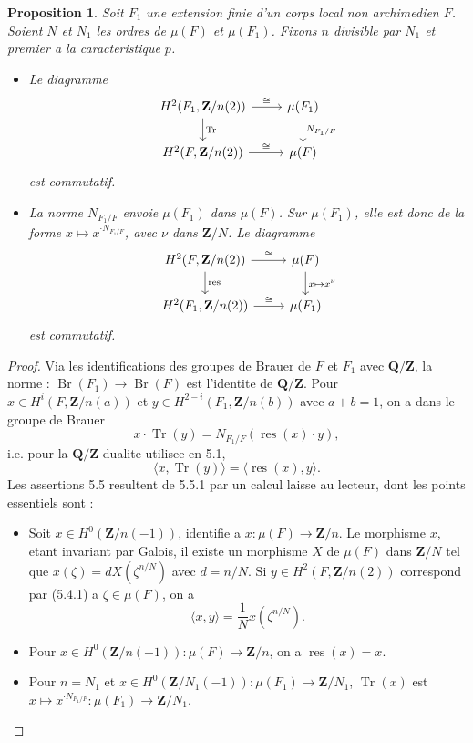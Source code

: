 \documentclass[11pt,a4paper]{article}
\theoremstyle{plain}
\newtheorem{proposition}[theorem]{Proposition}
\theoremstyle{definition}
\DeclareMathOperator{\Br}{Br}
\DeclareMathOperator{\res}{res}
\DeclareMathOperator{\Tr}{Tr}
\begin{document}
\begin{proposition}\label{5.5}
Soit $F_1$ une extension finie d'un corps local non archimedien $F$. Soient $N$ et $N_1$ les ordres de $\mu(F)$ et $\mu(F_1)$. Fixons $n$ divisible par $N_1$ et premier a la caracteristique $p$.
\begin{itemize}
\item[(i)] Le diagramme
\[
\begin{tikzcd}
H^2(F_1, \mathbf{Z}/n(2)) \arrow{r}{\cong} \arrow{d}{\Tr} & \mu(F_1) \arrow{d}{N_{F_1/F}} \\
H^2(F, \mathbf{Z}/n(2)) \arrow{r}{\cong} & \mu(F)
\end{tikzcd}
\]
est commutatif.
\item[(ii)] La norme $N_{F_1/F}$ envoie $\mu(F_1)$ dans $\mu(F)$. Sur $\mu(F_1)$, elle est donc de la forme $x \mapsto x^{\cdot N_{F_1/F}}$, avec $\nu$ dans $\mathbf{Z}/N$. Le diagramme
\[
\begin{tikzcd}
H^2(F, \mathbf{Z}/n(2)) \arrow{r}{\cong} \arrow{d}{\res} & \mu(F) \arrow{d}{x \mapsto x^{\nu}} \\
H^2(F_1, \mathbf{Z}/n(2)) \arrow{r}{\cong} & \mu(F_1)
\end{tikzcd}
\]
est commutatif.
\end{itemize}
\end{proposition}

\begin{proof}
Via les identifications des groupes de Brauer de $F$ et $F_1$ avec $\mathbf{Q}/\mathbf{Z}$, la norme : $\Br(F_1) \to \Br(F)$ est l'identite de $\mathbf{Q}/\mathbf{Z}$. Pour $x \in H^i(F, \mathbf{Z}/n(a))$ et $y \in H^{2-i}(F_1, \mathbf{Z}/n(b))$ avec $a + b = 1$, on a dans le groupe de Brauer
\[
x \cdot \Tr(y) = N_{F_1/F}(\res(x) \cdot y),
\]
i.e. pour la $\mathbf{Q}/\mathbf{Z}$-dualite utilisee en 5.1,
\begin{equation}\label{5.5.1}
\langle x, \Tr(y) \rangle = \langle \res(x), y \rangle.
\end{equation}
Les assertions 5.5 resultent de 5.5.1 par un calcul laisse au lecteur, dont les points essentiels sont :
\begin{itemize}
\item[a)] Soit $x \in H^0(\mathbf{Z}/n(-1))$, identifie a $x : \mu(F) \to \mathbf{Z}/n$. Le morphisme $x$, etant invariant par Galois, il existe un morphisme $X$ de $\mu(F)$ dans $\mathbf{Z}/N$ tel que $x(\zeta) = d X(\zeta^{n/N})$ avec $d = n/N$. Si $y \in H^2(F, \mathbf{Z}/n(2))$ correspond par (5.4.1) a $\zeta \in \mu(F)$, on a
\[
\langle x, y \rangle = \frac{1}{N} x(\zeta^{n/N}).
\]
\item[b)] Pour $x \in H^0(\mathbf{Z}/n(-1)) : \mu(F) \to \mathbf{Z}/n$, on a $\res(x) = x$.
\item[c)] Pour $n = N_1$ et $x \in H^0(\mathbf{Z}/N_1(-1)) : \mu(F_1) \to \mathbf{Z}/N_1$, $\Tr(x)$ est $x \mapsto x^{\cdot N_{F_1/F}} : \mu(F_1) \to \mathbf{Z}/N_1$. \qedhere
\end{itemize}
\end{proof}
\end{document}
